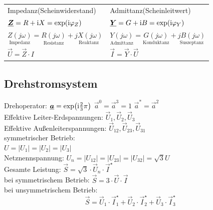 \documentclass[fs, footer]{latex4ei}
\begin{document}
\begin{multicols}{4}
    \begin{tabular}{ll}
        Impedanz(Scheinwiderstand)                                                                                                   & Admittanz(Scheinleitwert)                                                                                                        \\
        $\underline{\boldsymbol {Z}} = R + \mathrm{i} X = \exp(\mathrm{i} \varphi_Z)$                                                                                     & $\underline{\boldsymbol {Y}} = G + \mathrm{i} B = \exp(\mathrm{i} \varphi_Y)$                                                                                         \\
        $\underset{\text{Impedanz}}{Z(j\omega)} = \underset{\text{Resistanz}}{R(j\omega)} + \underset{\text{Reaktanz}}{jX(j\omega)}$ & $\underset{\text{Admittanz}}{Y(j\omega)} = \underset{\text{Konduktanz}}{G(j\omega)} + \underset{\text{Suszeptanz}}{jB(j\omega)}$ \\
        $\vec U = \vec Z \cdot I $                                                                                                   & $\vec I = \vec Y \cdot \vec U$                                                                                                   \\
    \end{tabular}



    \subsection{Drehstromsystem}
    Drehoperator: $\underline{\boldsymbol {a}} = \exp\bigl(\mathrm{i} \frac{2}{3} \pi \bigr)$ \qquad $\vec a^0 = \vec a^3 = 1$ \quad $\vec a^* = \vec a^2$\\


    Effektive Leiter-Erdspannungen: $\vec U_1,\vec U_2,\vec U_3$\\
    Effektive Außenleiterspannungen: $\vec U_{12},\vec U_{23},\vec U_{31}$\\
    symmetrischer Betrieb:\\
    $U = |U_1| = |U_2| = |U_3|$\\
    Netznennspannung: $U_n = |U_{12}| = |U_{23}| = |U_{32}| = \sqrt{3} U$\\
    Gesamte Leistung: $\vec S = \sqrt{3} \cdot \vec U_n \cdot \vec I^\star$\\
    bei symmetrischem Betrieb: $\vec S = 3 \cdot \vec U \cdot \vec I$\\
    bei unsymmetrischem Betrieb:
    \[\vec S = \vec U_1 \cdot \vec I_1^\star + \vec U_2 \cdot \vec I_2^\star + \vec U_3 \cdot \vec I_3^\star\]


\end{multicols}
\end{document}
